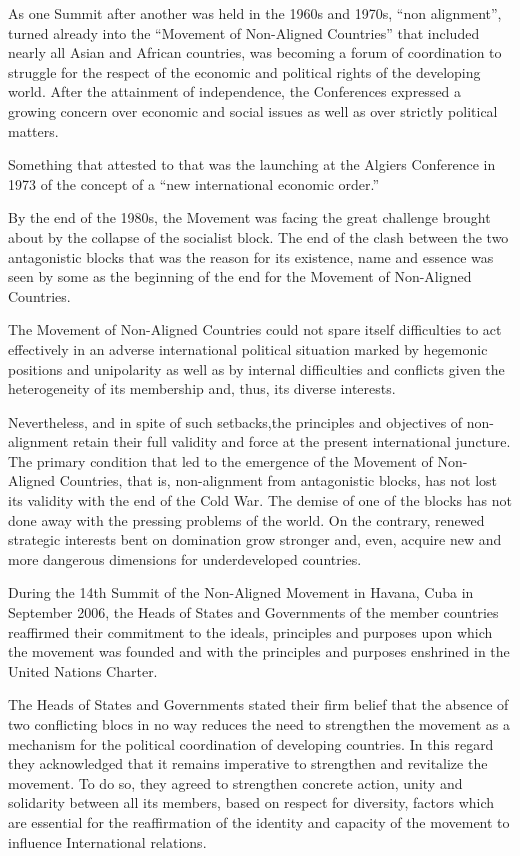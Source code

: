 \documentclass[
  openany]{book}
\begin{document}
As one Summit after another was held in the 1960s and 1970s, ``non alignment'', turned already into the ``Movement of Non-Aligned Countries'' that included nearly all Asian and African countries, was becoming a forum of coordination to struggle for the respect of the economic and political rights of the developing world. After the attainment of independence, the Conferences expressed a growing concern over economic and social issues as well as over strictly political matters.

Something that attested to that was the launching at the Algiers Conference in 1973 of the concept of a ``new international economic order.''

By the end of the 1980s, the Movement was facing the great challenge brought about by the collapse of the socialist block. The end of the clash between the two antagonistic blocks that was the reason for its existence, name and essence was seen by some as the beginning of the end for the Movement of Non-Aligned Countries.

The Movement of Non-Aligned Countries could not spare itself difficulties to act effectively in an adverse international political situation marked by hegemonic positions and unipolarity as well as by internal difficulties and conflicts given the heterogeneity of its membership and, thus, its diverse interests.

Nevertheless, and in spite of such setbacks,the principles and objectives of non-alignment retain their full validity and force at the present international juncture. The primary condition that led to the emergence of the Movement of Non-Aligned Countries, that is, non-alignment from antagonistic blocks, has not lost its validity with the end of the Cold War. The demise of one of the blocks has not done away with the pressing problems of the world. On the contrary, renewed strategic interests bent on domination grow stronger and, even, acquire new and more dangerous dimensions for underdeveloped countries.

During the 14th Summit of the Non-Aligned Movement in Havana, Cuba in September 2006, the Heads of States and Governments of the member countries reaffirmed their commitment to the ideals, principles and purposes upon which the movement was founded and with the principles and purposes enshrined in the United Nations Charter.

The Heads of States and Governments stated their firm belief that the absence of two conflicting blocs in no way reduces the need to strengthen the movement as a mechanism for the political coordination of developing countries. In this regard they acknowledged that it remains imperative to strengthen and revitalize the movement. To do so, they agreed to strengthen concrete action, unity and solidarity between all its members, based on respect for diversity, factors which are essential for the reaffirmation of the identity and capacity of the movement to influence International relations.
\end{document}
